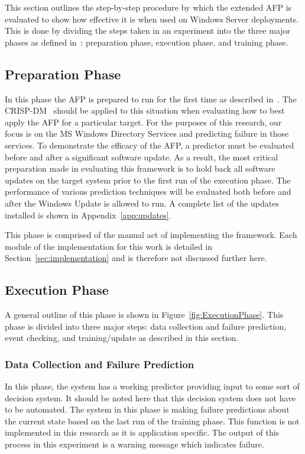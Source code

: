 This section outlines the step-by-step procedure by which the extended \ac{AFP}
is evaluated to show how effective it is when used on Windows Server
deployments.  This is done by dividing the steps taken in an experiment into
the three major phases as defined in~\cite{irrera2015}: preparation phase,
execution phase, and training phase.

\subsection{Preparation Phase}
In this phase the \ac{AFP} is prepared to run for the first time as described
in~\cite{irrera2015}.  The \ac{CRISP-DM}~\cite{crispdm} should be applied to
this situation when evaluating how to best apply the \ac{AFP} for a particular
target.  For the purposes of this research, our focus is on the \ac{MS}
Windows Directory Services and predicting failure in those services.  To
demonstrate the efficacy of the \ac{AFP}, a predictor must be evaluated before
and after a significant software update.  As a result, the most critical
preparation made in evaluating this framework is to hold back all software
updates on the target system prior to the first run of the execution phase.
The performance of various prediction techniques will be evaluated both before
and after the Windows Update is allowed to run.  A complete list of the updates
installed is shown in Appendix~\ref{app:updates}.

This phase is comprised of the manual act of implementing the framework.  Each
module of the implementation for this work is detailed in
Section~\ref{sec:implementation} and is therefore not discussed further here.  

\subsection{Execution Phase}
A general outline of this phase is shown in Figure~\ref{fig:ExecutionPhase}.
This phase is divided into three major steps: data collection and failure
prediction, event checking, and training/update as described in this section.

\figExecutionPhase{2.5in}

\subsubsection{Data Collection and Failure Prediction}
In this phase, the system has a working predictor providing input to some sort
of decision system.  It should be noted here that this decision system does not
have to be automated.  The system in this phase is making failure predictions
about the current state based on the last run of the training phase.  This
function is not implemented in this research as it is application specific.
The output of this process in this experiment is a warning message which
indicates failure.

